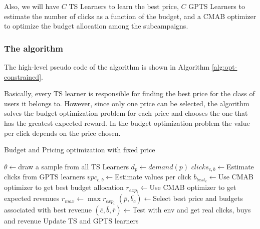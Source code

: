 Also, we will have $C$ TS Learners to learn the best price, $C$ GPTS Learners to estimate the number of clicks as a function of the budget, and a CMAB optimizer to optimize the budget allocation among the subcampaigns.

\subsubsection{The algorithm}
The high-level pseudo code of the algorithm is shown in Algorithm \ref{alg:opt-constrained}.

Basically, every TS learner is responsible for finding the best price for the class of users it belongs to.
However, since only one price can be selected, the algorithm solves the budget optimization problem for each price and chooses the one that has the greatest expected reward.
In the budget optimization problem the value per click depends on the price chosen.

\begin{algorithm}
    \caption{Budget and Pricing optimization with fixed price}
    \label{alg:opt-constrained}
	\begin{algorithmic}[1]
        \STATE $\theta\gets ${draw a sample from all TS Learners}
        \STATE $d_p \gets demand(p)$
        \STATE $clicks_{c,b} \gets${Estimate clicks from GPTS learners}
        \STATE $vpc_{c,b}\gets${Estimate values per click}
        \ENDFOR
        \STATE $b_{best_c} \gets${Use CMAB optimizer to get best budget allocation}
        \STATE $r_{exp_i} \gets${Use CMAB optimizer to get expected revenues}
        \ENDFOR
        \ENDFOR
        \STATE $r_{max} \gets \max{r_{exp_i}}$
        \STATE $(\bar{p}, \bar{b_c}) \gets${Select best price and budgets associated with best revenue}
        \STATE $(\bar{c}, \bar{b}, \bar{r}) \gets${Test with env and get real clicks, buys and revenue}
        \STATE Update TS and GPTS learners
        \ENDFOR
	\end{algorithmic}
\end{algorithm}

